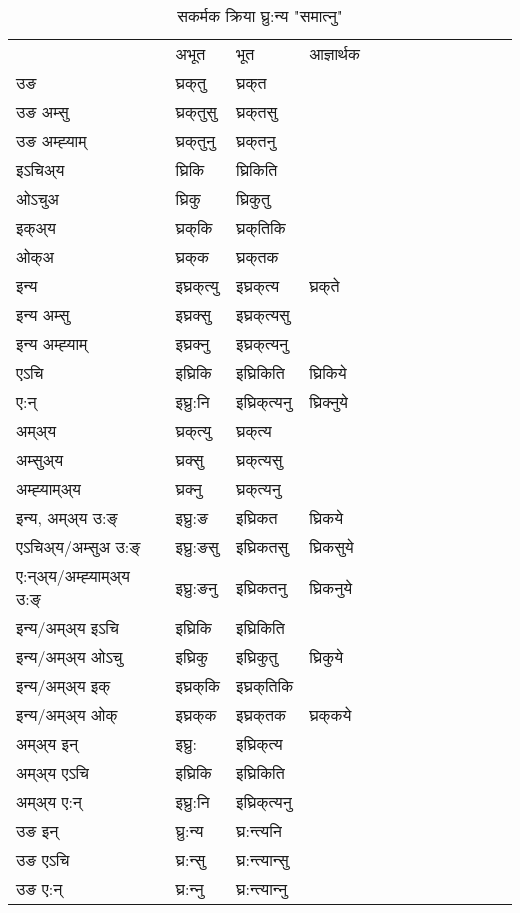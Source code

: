 \begin{table}[H]
\centering
\caption{\label{ikt.vt} सकर्मक क्रिया  घ्रु:न्य  "समात्‍नु"  }
\begin{tabular}{l|l|l|l|l|l|l|l|l|l|l|l|l}  \toprule
&अभूत & भूत & आज्ञार्थक \\ 
उङ &घ्रक्‌तु &घ्रक्‌त \\ 
उङ अम्सु&घ्रक्‌तुसु &घ्रक्‌तसु \\ 
उङ अम्ह्‍याम्&घ्रक्‌तुनु &घ्रक्‌तनु \\ 
इऽचिअ्य &घ्रिकि &घ्रिकिति   \\ 
ओऽचुअ        &घ्रिकु &घ्रिकुतु   \\ 
इक्अ्य&घ्रक्‌कि &घ्रक्‌तिकि   \\ 
ओक्अ &घ्रक्‌क &घ्रक्‌तक   \\ 
इन्य & इघ्रक्‌त्यु  & इघ्रक्‌त्य &घ्रक्‌ते  \\ 
इन्य अम्सु& इघ्रक्सु  & इघ्रक्‌त्यसु   \\ 
इन्य अम्ह्‍याम्& इघ्रक्‍नु  & इघ्रक्‌त्यनु   \\ 
एऽचि & इघ्रिकि & इघ्रिकिति &घ्रिकिये    \\ 
ए:न् & इघ्रु:नि  & इघ्रिक्‌त्यनु &घ्रिक्‍नुये  \\ 
अम्अ्य & घ्रक्‌त्यु  & घ्रक्‌त्य  \\ 
अम्सुअ्य & घ्रक्सु & घ्रक्‌त्यसु  \\ 
अम्ह्‍याम्अ्य & घ्रक्‍नु  & घ्रक्‌त्यनु \\ 
\midrule
इन्य, अम्अ्य उ:ङ्‌ &इघ्रु:ङ &इघ्रिकत &घ्रिकये \\ 
एऽचिअ्य/अम्सुअ उ:ङ्‌ &इघ्रु:ङसु &इघ्रिकतसु &घ्रिकसुये \\ 
ए:न्अ्य/अम्ह्‍याम्अ्य उ:ङ्‌ &इघ्रु:ङनु &इघ्रिकतनु &घ्रिकनुये \\ 
इन्य/अम्अ्य इऽचि &इघ्रिकि &इघ्रिकिति    \\ 
इन्य/अम्अ्य ओऽचु &इघ्रिकु &इघ्रिकुतु  &घ्रिकुये  \\ 
इन्य/अम्अ्य इक् &इघ्रक्‌कि &इघ्रक्‌तिकि   \\ 
इन्य/अम्अ्य ओक् &इघ्रक्‌क &इघ्रक्‌तक  &घ्रक्‌कये  \\ 
अम्अ्य इन् & इघ्रु: & इघ्रिक्‌त्य   \\ 
अम्अ्य एऽचि & इघ्रिकि & इघ्रिकिति    \\ 
अम्अ्य ए:न् & इघ्रु:नि  & इघ्रिक्‌त्यनु  \\ 
\midrule
उङ इन् & घ्रु:न्य  & घ्र:न्त्यनि  \\ 
उङ एऽचि & घ्र:न्सु  & घ्र:न्त्यान्सु   \\ 
उङ ए:न्& घ्र:न्‍नु  & घ्र:न्त्यान्‍नु   \\ 
\bottomrule
\end{tabular}
\end{table}


